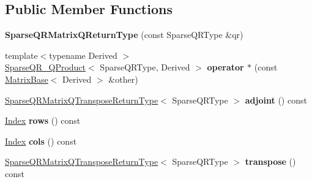 \subsection*{Public Member Functions}
\begin{DoxyCompactItemize}
\item 
\mbox{\label{struct_eigen_1_1_sparse_q_r_matrix_q_return_type_abc812ddc00be7a2064aebaf2391b38db}} 
{\bfseries Sparse\+Q\+R\+Matrix\+Q\+Return\+Type} (const Sparse\+Q\+R\+Type \&qr)
\item 
\mbox{\label{struct_eigen_1_1_sparse_q_r_matrix_q_return_type_ac65ef8328086e4a921503e8f4f99e985}} 
{\footnotesize template$<$typename Derived $>$ }\\\mbox{\hyperlink{struct_eigen_1_1_sparse_q_r___q_product}{Sparse\+Q\+R\+\_\+\+Q\+Product}}$<$ Sparse\+Q\+R\+Type, Derived $>$ {\bfseries operator $\ast$} (const \mbox{\hyperlink{class_eigen_1_1_matrix_base}{Matrix\+Base}}$<$ Derived $>$ \&other)
\item 
\mbox{\label{struct_eigen_1_1_sparse_q_r_matrix_q_return_type_a0902d548d7f36fea171283e6fa865d9d}} 
\mbox{\hyperlink{struct_eigen_1_1_sparse_q_r_matrix_q_transpose_return_type}{Sparse\+Q\+R\+Matrix\+Q\+Transpose\+Return\+Type}}$<$ Sparse\+Q\+R\+Type $>$ {\bfseries adjoint} () const
\item 
\mbox{\label{struct_eigen_1_1_sparse_q_r_matrix_q_return_type_a93c8c61654bf112f42db9c61969b94eb}} 
\mbox{\hyperlink{struct_eigen_1_1_eigen_base_a554f30542cc2316add4b1ea0a492ff02}{Index}} {\bfseries rows} () const
\item 
\mbox{\label{struct_eigen_1_1_sparse_q_r_matrix_q_return_type_add2a611eb8ecf1927f6ca326d86801e0}} 
\mbox{\hyperlink{struct_eigen_1_1_eigen_base_a554f30542cc2316add4b1ea0a492ff02}{Index}} {\bfseries cols} () const
\item 
\mbox{\label{struct_eigen_1_1_sparse_q_r_matrix_q_return_type_a852f381b6742ef40f5168b54f8b95c1c}} 
\mbox{\hyperlink{struct_eigen_1_1_sparse_q_r_matrix_q_transpose_return_type}{Sparse\+Q\+R\+Matrix\+Q\+Transpose\+Return\+Type}}$<$ Sparse\+Q\+R\+Type $>$ {\bfseries transpose} () const
\end{DoxyCompactItemize}
